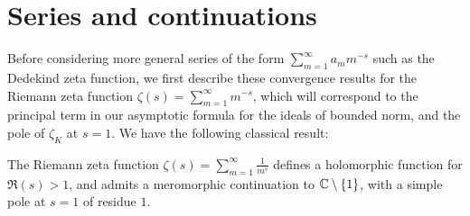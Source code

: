 \documentclass[11pt]{report}
\begin{document}
\section{Series and continuations} %
Before considering more general series of the form $\sum_{m = 1}^\infty a_mm^{-s}$ such as the Dedekind zeta function, we first describe these convergence results for the Riemann zeta function $\zeta(s) = \sum_{m = 1}^\infty m^{-s}$, which will correspond to the principal term in our asymptotic formula for the ideals of bounded norm, and the pole of $\zeta_K$ at $s = 1$. We have the following classical result:
\begin{lemma}
    The Riemann zeta function $\zeta(s) = \sum_{m = 1}^\infty \frac1{m^s}$ defines a holomorphic function for $\Re(s) > 1$, and admits a meromorphic continuation to $\mathbb{C} \setminus \left\{  1  \right\}$, with a simple pole at $s = 1$ of residue $1$.
\end{lemma}
\end{document}
